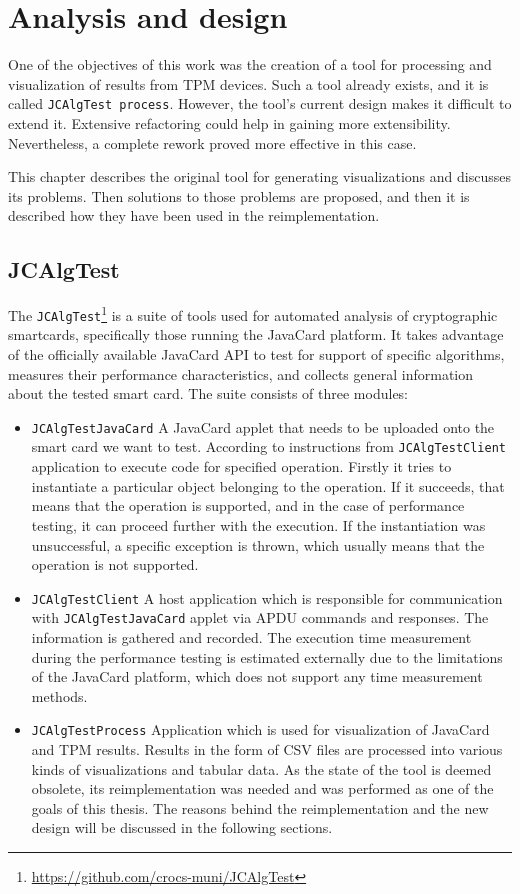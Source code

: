 \chapter{Analysis and design}
One of the objectives of this work was the creation of a tool for processing and visualization of results from TPM devices. Such a tool already exists, and it is called \texttt{JCAlgTest process}. However, the tool's current design makes it difficult to extend it. Extensive refactoring could help in gaining more extensibility. Nevertheless, a complete rework proved more effective in this case.

This chapter describes the original tool for generating visualizations and discusses its problems. Then solutions to those problems are proposed, and then it is described how they have been used in the reimplementation.

\section{JCAlgTest}
The \texttt{JCAlgTest}\footnote{\url{https://github.com/crocs-muni/JCAlgTest}} is a suite of tools used for automated analysis of cryptographic smartcards, specifically those running the JavaCard platform. It takes advantage of the officially available JavaCard API to test for support of specific algorithms, measures their performance characteristics, and collects general information about the tested smart card. The suite consists of three modules:
\begin{itemize}
  \item
        \texttt{JCAlgTestJavaCard} A JavaCard applet that needs to be uploaded onto the smart card we want to test. According to instructions from \texttt{JCAlgTestClient} application to execute code for specified operation. Firstly it tries to instantiate a particular object belonging to the operation. If it succeeds, that means that the operation is supported, and in the case of performance testing, it can proceed further with the execution. If the instantiation was unsuccessful, a specific exception is thrown, which usually means that the operation is not supported.
  \item
        \texttt{JCAlgTestClient} A host application which is responsible for communication with \texttt{JCAlgTestJavaCard} applet via APDU commands and responses. The information is gathered and recorded. The execution time measurement during the performance testing  is estimated externally due to the limitations of the JavaCard platform, which does not support any time measurement methods.
  \item
        \texttt{JCAlgTestProcess} Application which is used for visualization of JavaCard and TPM results. Results in the form of CSV files are processed into various kinds of visualizations and tabular data. As the state of the tool is deemed obsolete, its reimplementation was needed and was performed as one of the goals of this thesis. The reasons behind the reimplementation and the new design will be discussed in the following sections.
\end{itemize}

